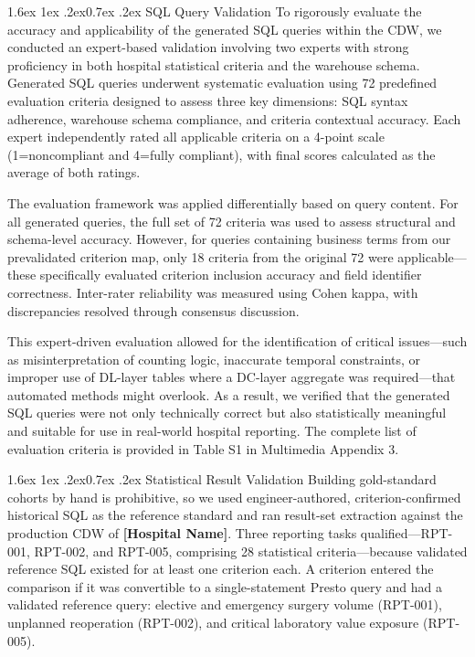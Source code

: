 \documentclass[10pt,twocolumn]{article}
\makeatletter
\renewcommand\subsubsection{\@startsection{subsubsection}{3}{\z@}%
  {1.6ex \@plus 1ex \@minus .2ex}{0.7ex \@plus .2ex}%
  {\normalfont\normalsize\itshape}}
\newcommand{\PH}[1]{{\color{red}\textbf{[#1]}}}
\makeatother
\begin{document}
\subsubsection{SQL Query Validation}
To rigorously evaluate the accuracy and applicability of the generated SQL
queries within the CDW, we conducted an expert-based validation involving two
experts with strong proficiency in both hospital statistical criteria and the
warehouse schema. Generated SQL queries underwent systematic evaluation using 72
predefined evaluation criteria designed to assess three key dimensions: SQL
syntax adherence, warehouse schema compliance, and criteria contextual accuracy.
Each expert independently rated all applicable criteria on a 4-point scale
(1=noncompliant and 4=fully compliant), with final scores calculated as the
average of both ratings.

The evaluation framework was applied differentially based on query content. For
all generated queries, the full set of 72 criteria was used to assess structural
and schema-level accuracy. However, for queries containing business terms from
our prevalidated criterion map, only 18 criteria from the original 72 were
applicable---these specifically evaluated criterion inclusion accuracy and field
identifier correctness. Inter-rater reliability was measured using Cohen kappa,
with discrepancies resolved through consensus discussion.

This expert-driven evaluation allowed for the identification of critical
issues---such as misinterpretation of counting logic, inaccurate temporal
constraints, or improper use of DL-layer tables where a DC-layer aggregate was
required---that automated methods might overlook. As a result, we verified that
the generated SQL queries were not only technically correct but also
statistically meaningful and suitable for use in real-world hospital reporting.
The complete list of evaluation criteria is provided in Table S1 in Multimedia
Appendix 3.

\subsubsection{Statistical Result Validation}
Building gold-standard cohorts by hand is prohibitive, so we used engineer-authored, criterion-confirmed historical SQL as the reference standard and ran result-set extraction against the production CDW of \PH{Hospital Name}. Three reporting tasks qualified---RPT-001, RPT-002, and RPT-005, comprising 28 statistical criteria---because validated reference SQL existed for at least one criterion each. A criterion entered the comparison if it was convertible to a single-statement Presto query and had a validated reference query: elective and emergency surgery volume (RPT-001), unplanned reoperation (RPT-002), and critical laboratory value exposure (RPT-005).
\end{document}
